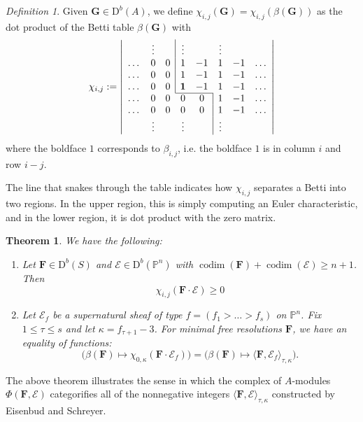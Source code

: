 \documentclass[12pt]{amsart}
\newtheorem{thm}[lemma]{Theorem}
\theoremstyle{definition}
\theoremstyle{remark}
\newtheorem{defn}[lemma]{Definition}
\newcommand{\codim}{\operatorname{codim}}
\newcommand{\PP}{\mathbb{P}}
\newcommand{\QQ}{\mathbb{Q}}
\newcommand{\VV}{\mathrm{V}}
\newcommand{\cE}{\mathcal{E}}
\newcommand{\FF}{\mathbf{F}}
\newcommand{\Gbull}{\mathbf{G}}
\newcommand{\DD}{\mathrm{D}}
\begin{document}
\begin{defn}\label{defn:chi}
Given $\Gbull\in \DD^b(A)$, we define $\chi_{i,j}(\Gbull)=\chi_{i,j}(\beta(\Gbull))$ as the dot product of the Betti table $\beta(\Gbull)$ with
\[
\chi_{i,j}:=
\left|
\begin{array}{cccccccc}
 & \vdots& &\multicolumn{1}{|c}{\vdots}&& \vdots&&\\
\dots&0&0&\multicolumn{1}{|c}{1}&-1&1&-1&\dots\\
\dots&0&0&\multicolumn{1}{|c}{1}&-1&1&-1&\dots\\
\dots&0&0&\multicolumn{1}{|c}{\mathbf{1}}&-1&1&-1&\dots\\ \cline{4-5}
\dots&0&0&0&0&\multicolumn{1}{|c}{1}&-1&\dots\\
\dots&0&0&0&0&\multicolumn{1}{|c}{1}&-1&\dots\\
& \vdots&&\vdots&& \multicolumn{1}{|c}{\vdots}&&\\
\end{array}
\right|
\]
where the boldface $1$ corresponds to $\beta_{i,j}$, i.e. the boldface $1$ is in column $i$ and row $i-j$. 
\end{defn}
The line that snakes through
the table indicates how $\chi_{i,j}$ separates a Betti into two regions.  In the upper region, this is simply computing an Euler characteristic, and in the lower region, it is dot product with the zero matrix.  

\begin{thm}\label{thm:categorified}
We have the following:
\begin{enumerate}
	\item\label{thm:categorified:1}  Let $\FF\in \DD^b(S)$ and $\cE\in \DD^b(\PP^n)$ with $\codim(\FF)+\codim(\cE)\geq n+1$.  Then
\[
\chi_{i,j}(\FF\cdot \cE)\geq 0
\]
	\item\label{thm:categorified:2}  Let $\cE_{f}$ be a supernatural sheaf of type $f=(f_1>\dots>f_s)$ on $\PP^n$.  Fix $1\leq \tau \leq s$ and let $\kappa=f_{\tau+1}-3$.  
For minimal free resolutions $\FF$, we have an equality of functions:
\[
\bigg( \beta(\FF)\mapsto \chi_{0,\kappa}(\FF\cdot \cE_f)\bigg) =\bigg( \beta(\FF)\mapsto \langle \FF, \cE_f\rangle_{\tau,\kappa} \bigg).
\]
\end{enumerate}
\end{thm}
The above theorem illustrates the sense in which the complex of $A$-modules $\Phi(\FF,\cE)$ categorifies all of the nonnegative integers $\langle \FF,\cE\rangle_{\tau,\kappa}$ constructed by Eisenbud and Schreyer.
\end{document}
